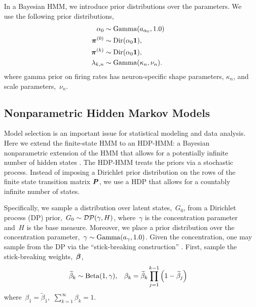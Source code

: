 
In a Bayesian HMM,  we introduce prior distributions over
the parameters. We use the following prior distributions,
\begin{align*}
  \alpha_0 &\sim \mathrm{Gamma}(a_{\alpha_0}, 1.0) \\
  \boldsymbol{\pi}^{(0)} &\sim \mathrm{Dir}(\alpha_0\boldsymbol{1}),\\
  \boldsymbol{\pi}^{(k)} &\sim \mathrm{Dir}(\alpha_0\boldsymbol{1}), \\
  \lambda_{k,n} &\sim \mathrm{Gamma}(\kappa_n,\nu_n).
\end{align*}
where gamma prior on firing rates has neuron-specific shape parameters,
$\kappa_n$, and scale parameters,~$\nu_n$.

\subsection{Nonparametric Hidden Markov Models}

Model selection is an important issue for statistical modeling and
data analysis.  Here we extend the finite-state HMM to an
HDP-HMM: a Bayesian nonparametric extension of the HMM that allows for
a potentially infinite number of hidden states \citep{Teh06,
  Beal02}. The HDP-HMM treats the priors via a stochastic
process. Instead of imposing a Dirichlet prior distribution on the
rows of the finite state transition matrix $\boldsymbol{P}$, we use a HDP that
allows for a countably infinite number of states.

Specifically, we sample a distribution over latent states,~$G_0$, from
a Dirichlet process (DP) \citep{Ferguson73}
prior,~${G_0\sim \mathcal{DP}(\gamma,H)}$, where~$\gamma$ is the
concentration parameter and~$H$ is the base measure.  Moreover, we
place a prior distribution over the concentration parameter,~${\gamma
\sim \mathrm{Gamma}(a_{\gamma}, 1.0)}$.  Given the concentration, one may
sample from the DP via the ``stick-breaking construction''
\citep{Sethuraman94}. First, sample the stick-breaking
weights,~$\boldsymbol{\beta}$,
\begin{eqnarray}                                   
\widetilde{\beta}_{k}\sim \mathrm{Beta}(1,\gamma), \;\;\; 
\beta_{k}=\widetilde{\beta}_{k}\prod_{j=1}^{k-1}\Big(1-\widetilde{\beta}_{j}\Big)
\label{stick1}
\end{eqnarray}
where~$\beta_1 = \widetilde{\beta}_1$,~$\sum_{k=1}^\infty \beta_{k}=1$.

